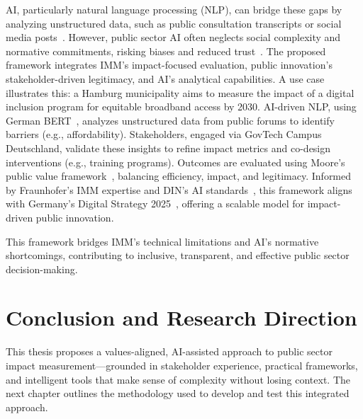 AI, particularly natural language processing (NLP), can bridge these gaps by analyzing unstructured data, such as public consultation transcripts or social media posts~\cite{oecd_2023}.
However, public sector AI often neglects social complexity and normative commitments, risking biases and reduced trust~\cite{eu_2024}.
The proposed framework integrates IMM’s impact-focused evaluation, public innovation’s stakeholder-driven legitimacy, and AI’s analytical capabilities.
A use case illustrates this: a Hamburg municipality aims to measure the impact of a digital inclusion program for equitable broadband access by 2030.
AI-driven NLP, using German BERT~\cite{huggingface_2023}, analyzes unstructured data from public forums to identify barriers (e.g., affordability).
Stakeholders, engaged via GovTech Campus Deutschland, validate these insights to refine impact metrics and co-design interventions (e.g., training programs).
Outcomes are evaluated using Moore’s public value framework~\cite{moore_1995}, balancing efficiency, impact, and legitimacy.
Informed by Fraunhofer’s IMM expertise and DIN’s AI standards~\cite{din_2023}, this framework aligns with Germany’s Digital Strategy 2025~\cite{bmwi_2022}, offering a scalable model for impact-driven public innovation.

This framework bridges IMM’s technical limitations and AI’s normative shortcomings, contributing to inclusive, transparent, and effective public sector decision-making.

\section{Conclusion and Research Direction}\label{sec:conclusion-and-research-direction}


This thesis proposes a values-aligned, AI-assisted approach to public sector impact measurement—grounded in stakeholder experience, practical frameworks, and intelligent tools that make sense of complexity without losing context.
The next chapter outlines the methodology used to develop and test this integrated approach.
